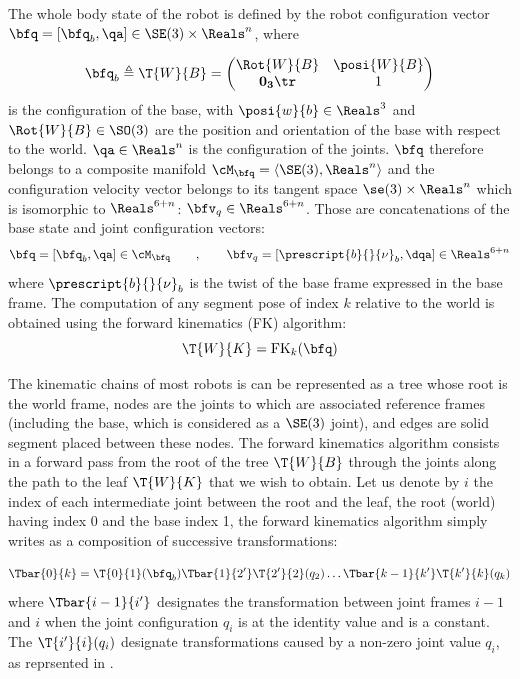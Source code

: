 The whole body state of the robot is defined by the robot configuration vector $\bfq=[\bfq_b,\qa]\in \SE(3) \times \Reals^n$, where 

\begin{equation}
    \bfq_b \triangleq \T{W}{B} =  
    \begin{pmatrix}
        \Rot{W}{B} & \posi{W}{B} \\
        \bf0_3\tr & 1
    \end{pmatrix}
\end{equation}
%
is the configuration of the base,
with $\posi{w}{b} \in \Reals^3$ and $\Rot{W}{B} \in \SO(3)$ are the position and orientation of the base with respect to the world.
$\qa \in \Reals^n$ is the configuration of the joints. $\bfq$ therefore belongs to a composite manifold $\cM_{\bfq} = \left<\SE(3), \Reals^n \right>$ and the configuration velocity vector belongs to its tangent space $\se(3)\times \Reals^n$ which is isomorphic to $\Reals^{6+n}$: $\bfv_q \in \Reals^{6+n}$. Those are concatenations
of the base state and joint configuration vectors:
%
\begin{equation}
    \bfq= [\bfq_b, \qa]\in \cM_{\bfq}\quad\quad,
    \quad\quad
    \bfv_q= [\prescript{b}{}{\mathbf{\nu}}_b,\dqa]  \in \Reals^{6+n}
    \label{eq:configuration}
\end{equation}
%
where $\prescript{b}{}{\mathbf{\nu}}_b$ is the twist of the base frame expressed in the base frame.
The computation of any segment pose of index $k$ relative to the world is obtained using the forward kinematics (FK) algorithm:
%
\begin{equation}
    \T{W}{K} = \text{FK}_k(\bfq)
\end{equation}

The kinematic chains of most robots is can be represented as a tree whose root is the world frame, nodes are the joints to which are associated reference frames (including the base, which is considered as a $\SE(3)$ joint), and edges are solid segment placed between these nodes.
The forward kinematics algorithm consists in a forward pass from the root of the tree $\T{W}{B}$ through the joints along the path to the leaf $\T{W}{K}$ that we wish to obtain. Let us denote by $i$ the index of each intermediate joint between the root and the leaf, the root (world) having index 0 and the base index 1, the forward kinematics algorithm simply writes as a composition of successive transformations:

\begin{equation}
    \Tbar{0}{k} = \T{0}{1}(\bfq_b) \Tbar{1}{2'}
    \T{2'}{2}(q_2) \dots  \Tbar{k-1}{k'} \T{k'}{k}(q_k)
\end{equation}
%
where $\Tbar{i-1}{i'}$ designates the transformation between joint frames $i-1$ and $i$ when the joint configuration $q_i$ is at the identity value and is a constant. 
The $\T{i'}{i}(q_i)$ designate transformations caused by a non-zero joint value $q_i$, as reprsented in .

